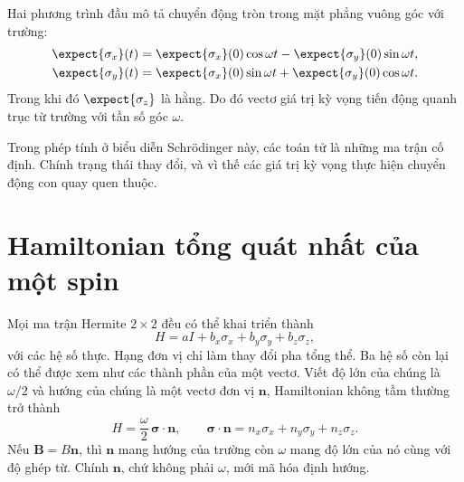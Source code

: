 Hai phương trình đầu mô tả chuyển động tròn trong mặt phẳng vuông góc với trường:
\begin{align}
\expect{\sigma_x}(t)
&=\expect{\sigma_x}(0)\cos\omega t
-\expect{\sigma_y}(0)\sin\omega t,\\
\expect{\sigma_y}(t)
&=\expect{\sigma_x}(0)\sin\omega t
+\expect{\sigma_y}(0)\cos\omega t.
\end{align}
Trong khi đó \(\expect{\sigma_z}\) là hằng. Do đó vectơ giá trị kỳ vọng tiến động quanh trục từ trường với tần số góc \(\omega\).

Trong phép tính ở biểu diễn Schr\"odinger này, các toán tử là những ma trận cố định. Chính trạng thái thay đổi, và vì thế các giá trị kỳ vọng thực hiện chuyển động con quay quen thuộc.

\begin{classroomqa}
\end{classroomqa}

\section{Hamiltonian tổng quát nhất của một spin}

Mọi ma trận Hermite \(2\times2\) đều có thể khai triển thành
\begin{equation}
H=aI+b_x\sigma_x+b_y\sigma_y+b_z\sigma_z,
\end{equation}
với các hệ số thực. Hạng đơn vị chỉ làm thay đổi pha tổng thể. Ba hệ số còn lại có thể được xem như các thành phần của một vectơ. Viết độ lớn của chúng là \(\omega/2\) và hướng của chúng là một vectơ đơn vị \(\bm n\), Hamiltonian không tầm thường trở thành
\begin{equation}
H=\frac{\omega}{2}\,\bm\sigma\cdot\bm n,
\qquad
\bm\sigma\cdot\bm n
=n_x\sigma_x+n_y\sigma_y+n_z\sigma_z.
\label{eq:l5-general-spin-h}
\end{equation}
Nếu \(\bm B=B\bm n\), thì \(\bm n\) mang hướng của trường còn \(\omega\) mang độ lớn của nó cùng với độ ghép từ. Chính \(\bm n\), chứ không phải \(\omega\), mới mã hóa định hướng.

